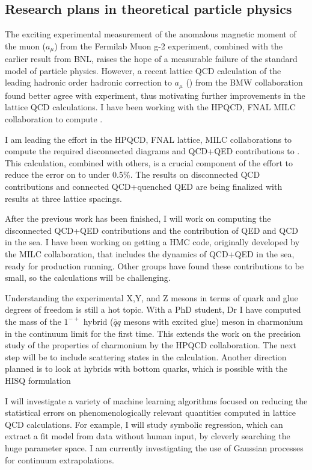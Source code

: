 \subsection{Research plans in theoretical particle physics}

The exciting experimental measurement of the anomalous magnetic
moment of the muon ($a_\mu$) from the Fermilab Muon g-2  experiment,
combined with the
earlier result from BNL, raises the hope of a measurable failure of the
standard model of particle physics.  However, a recent lattice QCD
calculation of the leading hadronic order hadronic correction to
$a_\mu$
(\amu)
from the BMW collaboration found better agree with experiment,
thus motivating further improvements in the lattice QCD
calculations. I have been working with the HPQCD, FNAL MILC
collaboration to compute \amu.

I am leading the effort in the HPQCD, FNAL lattice, MILC
collaborations to compute the required disconnected diagrams and
QCD+QED contributions to \amu. This calculation, combined with
others, is a crucial component of the effort to reduce the error on \amu
to under 0.5\%.
The results on disconnected QCD contributions and connected
QCD+quenched QED are being finalized with results at three lattice spacings.

After the previous work has been finished, I will work on
computing the disconnected QCD+QED contributions and the contribution
of QED and QCD in the sea. I have been working on getting a HMC
code, originally developed by the MILC collaboration, that includes
the dynamics of QCD+QED in the sea, ready for production running.
Other groups have found these contributions to be small, so the
calculations will be challenging. 




Understanding the experimental X,Y, and Z mesons in terms of quark and
glue degrees of freedom is still a hot topic. With a PhD student, Dr
I have computed the mass of the $1^{-+}$ hybrid ($\overline{q}q$
mesons with excited glue) meson in charmonium in the continuum limit
for the first time. This extends the work on the precision study of
the properties of charmonium by the HPQCD collaboration.
The next step will be to include scattering states in the calculation.
Another direction planned is to look at hybrids with bottom quarks,
which is possible with the HISQ formulation 

I will investigate a variety of machine learning algorithms
focused on reducing the statistical errors on phenomenologically
relevant quantities computed in lattice QCD calculations. For example,
I will study symbolic regression, which can extract a fit model from
data without human input, by cleverly searching the huge parameter
space. I am currently investigating the use of Gaussian processes
for continuum extrapolations.

